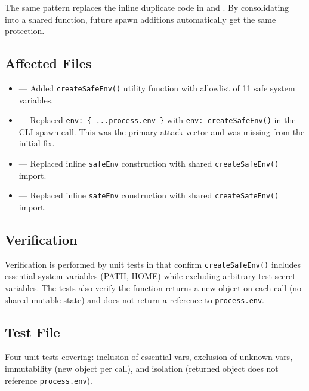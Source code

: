 The same pattern replaces the inline duplicate code in  and . By consolidating into a shared function, future spawn additions automatically get the same protection.

\subsection*{Affected Files}
\begin{itemize}
    \item {} --- Added \texttt{createSafeEnv()} utility function with allowlist of 11 safe system variables.
    \item {} --- Replaced \texttt{env: \{ ...process.env \}} with \texttt{env: createSafeEnv()} in the CLI spawn call. This was the primary attack vector and was missing from the initial fix.
    \item {} --- Replaced inline \texttt{safeEnv} construction with shared \texttt{createSafeEnv()} import.
    \item {} --- Replaced inline \texttt{safeEnv} construction with shared \texttt{createSafeEnv()} import.
\end{itemize}

\subsection*{Verification}
Verification is performed by unit tests in  that confirm \texttt{createSafeEnv()} includes essential system variables (PATH, HOME) while excluding arbitrary test secret variables. The tests also verify the function returns a new object on each call (no shared mutable state) and does not return a reference to \texttt{process.env}.

\subsection*{Test File}

Four unit tests covering: inclusion of essential vars, exclusion of unknown vars, immutability (new object per call), and isolation (returned object does not reference \texttt{process.env}).
